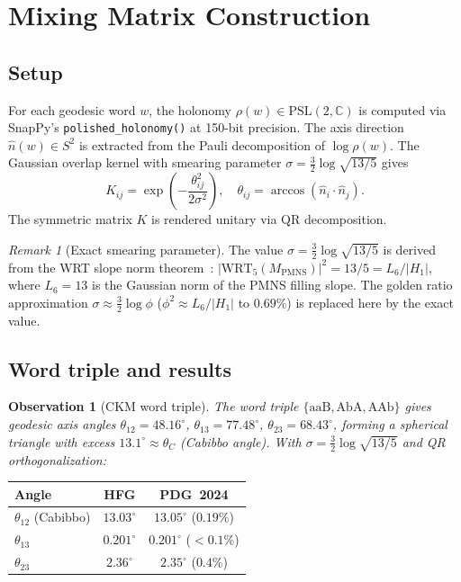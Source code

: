 \documentclass[11pt,a4paper]{article}
\newtheorem{observation}[theorem]{Observation}
\theoremstyle{remark}
\newtheorem{remark}[theorem]{Remark}
\newcommand{\MPMNS}{M_{\mathrm{PMNS}}}
\newcommand{\CC}{\mathbb{C}}
\newcommand{\PSL}{\mathrm{PSL}(2,\CC)}
\begin{document}
\section{Mixing Matrix Construction}
\label{sec:mixing}

\subsection{Setup}

For each geodesic word $w$, the holonomy $\rho(w) \in \PSL$ is
computed via SnapPy's \texttt{polished\_holonomy()} at 150-bit precision.
The axis direction $\hat{n}(w) \in S^2$ is extracted from the
Pauli decomposition of $\log\rho(w)$.
The Gaussian overlap kernel with smearing parameter
$\sigma = \frac{3}{2}\log\sqrt{13/5}$ gives
\[
K_{ij} = \exp\!\left(-\frac{\theta_{ij}^2}{2\sigma^2}\right),
\quad
\theta_{ij} = \arccos(\hat{n}_i \cdot \hat{n}_j).
\]
The symmetric matrix $K$ is rendered unitary via QR decomposition.

\begin{remark}[Exact smearing parameter]
The value $\sigma = \frac{3}{2}\log\sqrt{13/5}$ is derived from
the WRT slope norm theorem~\cite{Gentry:WRT}:
$|\mathrm{WRT}_5(\MPMNS)|^2 = 13/5 = L_6/|H_1|$,
where $L_6 = 13$ is the Gaussian norm of the PMNS filling slope.
The golden ratio approximation $\sigma \approx \frac{3}{2}\log\phi$
($\phi^2 \approx L_6/|H_1|$ to $0.69\%$) is replaced here by the
exact value.
\end{remark}

\subsection{Word triple and results}

\begin{observation}[CKM word triple]
\label{obs:triple}
The word triple $\{\mathrm{aaB},\mathrm{AbA},\mathrm{AAb}\}$
gives geodesic axis angles
$\theta_{12}=48.16^\circ$, $\theta_{13}=77.48^\circ$,
$\theta_{23}=68.43^\circ$,
forming a spherical triangle with excess $13.1^\circ \approx \theta_C$
(Cabibbo angle).
With $\sigma=\frac{3}{2}\log\sqrt{13/5}$ and QR orthogonalization:
\end{observation}

\begin{center}
\begin{tabular}{lcc}
\toprule
Angle & HFG & PDG~2024 \\
\midrule
$\theta_{12}$ (Cabibbo) & $13.03^\circ$ & $13.05^\circ$ ($0.19\%$) \\
$\theta_{13}$ & $0.201^\circ$ & $0.201^\circ$ ($<0.1\%$) \\
$\theta_{23}$ & $2.36^\circ$ & $2.35^\circ$ ($0.4\%$) \\
\bottomrule
\end{tabular}
\end{center}
\end{document}
